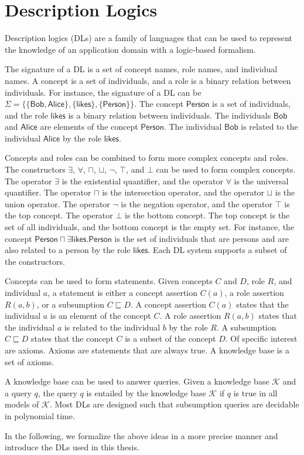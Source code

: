

%
\chapter*{\thechapter \quad Description Logics}
\label{appendixB}

Description logics (DLs) are a family of languages 
that can be used to represent the knowledge of 
an application domain with a logic-based formalism.

The signature of a DL is a set of concept names, role names, and individual names.
A concept is a set of individuals, and a role is a binary relation between individuals.
For instance, the signature of a DL can be $\Sigma = \{\{\mathsf{Bob}, \mathsf{Alice}\}, \{\mathsf{likes}\}, \{\mathsf{Person}\}\}$.
The concept $\mathsf{Person}$ is a set of individuals, and the role $\mathsf{likes}$ is a binary relation between individuals.
The individuals $\mathsf{Bob}$ and $\mathsf{Alice}$ are elements of the concept $\mathsf{Person}$.
The individual $\mathsf{Bob}$ is related to the individual $\mathsf{Alice}$ by the role $\mathsf{likes}$.

Concepts and roles can be combined to form more complex concepts and roles.
The constructors $\exists$, $\forall$, $\sqcap$, $\sqcup$, $\neg$, $\top$, and $\bot$ can be used to form complex concepts.
The operator $\exists$ is the existential quantifier, and the operator $\forall$ is the universal quantifier.
The operator $\sqcap$ is the intersection operator, and the operator $\sqcup$ is the union operator.
The operator $\neg$ is the negation operator, and the operator $\top$ is the top concept.
The operator $\bot$ is the bottom concept.
The top concept is the set of all individuals, and the bottom concept is the empty set.
For instance, the concept $\mathsf{Person} \sqcap \exists \mathsf{likes}.\mathsf{Person}$ is the set of individuals that are persons and
are also related to a person by the role $\mathsf{likes}$.
Each DL system supports a subset of the constructors.

Concepts can be used to form statements.
Given concepts $C$ and $D$, role $R$, and individual $a$,
a statement is either a concept assertion $C(a)$, a role assertion $R(a, b)$, or a subsumption $C \sqsubseteq D$.
A concept assertion $C(a)$ states that the individual $a$ is an element of the concept $C$.
A role assertion $R(a, b)$ states that the individual $a$ is related to the individual $b$ by the role $R$.
A subsumption $C \sqsubseteq D$ states that the concept $C$ is a subset of the concept $D$.
Of specific interest are axioms.
Axioms are statements that are always true.
A knowledge base is a set of axioms.

A knowledge base can be used to answer queries.
Given a knowledge base $\mathcal{K}$ and a query $q$,
the query $q$ is entailed by the knowledge base $\mathcal{K}$ if $q$ is true in all models of $\mathcal{K}$.
Most DLs are designed such that subsumption queries are decidable in polynomial time.

In the following, we formalize the above ideas in a more precise manner
and introduce the DLs used in this thesis.

